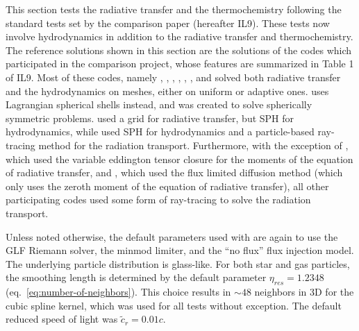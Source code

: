 This section tests the radiative transfer and the thermochemistry following the standard tests set
by the comparison paper \cite{ilievCosmologicalRadiativeTransfer2009} (hereafter IL9). These tests
now involve hydrodynamics in addition to the radiative transfer and thermochemistry.
The reference solutions shown in this section are the solutions of the codes which participated in
the comparison project, whose features are summarized in Table 1 of IL9. Most of these codes, namely
 \citep{mellema2RayNewMethod2006, mellemaDynamicalIiRegion2006},
 \citep{mellema2RayNewMethod2006, tracMovingFrameAlgorithm2004},
 \citep{kravtsovAdaptiveRefinementTree1997,
kravtsovConstrainedSimulationsReal2002,gnedinModelingMolecularHydrogen2009},
 \citep{whalenMultistepAlgorithmRadiation2006},
 \citep{mellemaPhotoevaporationClumpsPlanetary1998,
shapiroPhotoevaporationCosmologicalMinihaloes2004},
 \citep{rijkhorstHybridCharacteristics3D2006}, and
 \citep{normanSimulatingCosmologicalEvolution2007a}
solved both radiative transfer and the hydrodynamics on meshes, either on uniform or adaptive ones.
 \citep{ahnDoesRadiativeFeedback2007} uses Lagrangian spherical shells instead, and
was created to solve spherically symmetric problems.
 \citep{baekSimulated21Cm2009} used a grid for radiative transfer, but SPH for
hydrodynamics, while  \citep{susaSmoothedParticleHydrodynamics2006}
used SPH for hydrodynamics and a particle-based ray-tracing method for the
radiation transport. Furthermore, with the exception of , which used the variable
eddington tensor closure for the moments of the equation of radiative transfer, and
, which used the flux limited diffusion method (which only uses the zeroth
moment of the equation of radiative transfer), all other participating codes used some form of
ray-tracing to solve the radiation transport.

Unless noted otherwise, the default parameters used with \GEARRT are again to use the GLF Riemann
solver, the minmod limiter, and the ``no flux'' flux injection model. The underlying particle
distribution is glass-like. For both star and gas particles, the smoothing length is determined by
the default parameter $\eta_{res} = 1.2348$ (eq.~\ref{eq:number-of-neighbors}). This choice results
in $\sim 48$ neighbors in 3D for the cubic spline kernel, which was used for all tests without
exception. The default reduced speed of light was $\tilde{c}_r = 0.01 c$.











